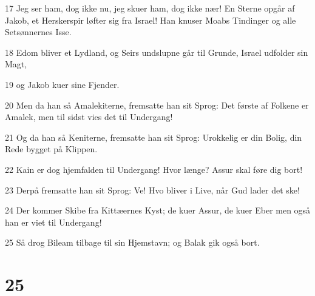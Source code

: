\par 17 Jeg ser ham, dog ikke nu, jeg skuer ham, dog ikke nær! En Sterne opgår af Jakob, et Herskerspir løfter sig fra Israel! Han knuser Moabs Tindinger og alle Setsønnernes Isse.
\par 18 Edom bliver et Lydland, og Seirs undslupne går til Grunde, Israel udfolder sin Magt,
\par 19 og Jakob kuer sine Fjender.
\par 20 Men da han så Amalekiterne, fremsatte han sit Sprog: Det første af Folkene er Amalek, men til sidst vies det til Undergang!
\par 21 Og da han så Keniterne, fremsatte han sit Sprog: Urokkelig er din Bolig, din Rede bygget på Klippen.
\par 22 Kain er dog hjemfalden til Undergang! Hvor længe? Assur skal føre dig bort!
\par 23 Derpå fremsatte han sit Sprog: Ve! Hvo bliver i Live, når Gud lader det ske!
\par 24 Der kommer Skibe fra Kittæernes Kyst; de kuer Assur, de kuer Eber men også han er viet til Undergang!
\par 25 Så drog Bileam tilbage til sin Hjemstavn; og Balak gik også bort.

\chapter{25}

